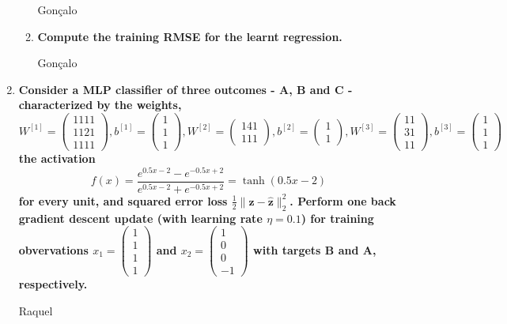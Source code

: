 \documentclass[12pt]{article}
\begin{document}
\begin{enumerate}[leftmargin=\labelsep]
\begin{enumerate}
              \vskip 0.3cm
              Gonçalo

        \item \textbf{Compute the training RMSE for the learnt regression.}

              \vskip 0.3cm
              Gonçalo
    \end{enumerate}

    \item \textbf{Consider a MLP classifier of three outcomes - A, B and C - characterized by the weights,} \\

          \vskip -0.2cm
          $W^{[1]} = \begin{pmatrix} 1 1 1 1 \\ 1 1 2 1 \\ 1 1 1 1\end{pmatrix}, b^{[1]} = \begin{pmatrix} 1 \\ 1 \\ 1 \end{pmatrix},
          W^{[2]} = \begin{pmatrix} 1 4 1 \\ 1 1 1 \end{pmatrix}, b^{[2]} = \begin{pmatrix} 1 \\ 1 \end{pmatrix},
          W^{[3]} = \begin{pmatrix} 1 1 \\ 3 1 \\ 1 1\end{pmatrix}, b^{[3]} = \begin{pmatrix} 1 \\ 1 \\ 1 \end{pmatrix}$ \\

          \textbf{the activation \[ f(x) = \frac{{e^{0.5x - 2} - e^{-0.5x + 2}}}{{e^{0.5x - 2} + e^{-0.5x + 2}}} = \tanh(0.5x - 2) \] for every unit, and squared error
          loss $\frac{1}{2} \|\mathbf{z} - \hat{\mathbf{z}}\|^{2}_{2}$. Perform one back gradient descent update (with learning rate $\eta = 0.1$) for training
          obvervations $x_1 = \begin{pmatrix} 1 \\ 1 \\ 1 \\ 1 \end{pmatrix}$ and $x_2 = \begin{pmatrix} 1 \\ 0 \\ 0 \\ -1 \end{pmatrix}$ with targets B and A,
          respectively.}

          \vskip 0.3cm
          Raquel
\end{enumerate}
\end{document}
